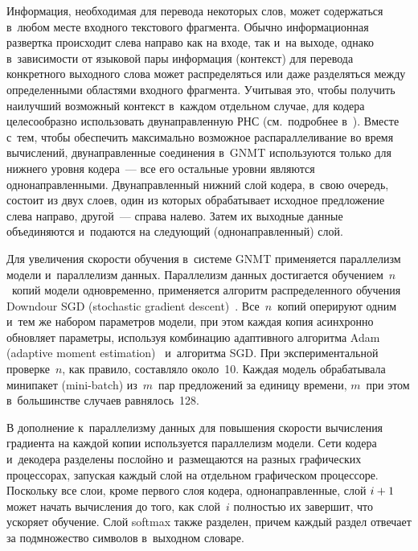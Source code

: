 \begin{multicols}{2}
  Информация, необходимая для перевода некоторых слов, может содержаться 
в~любом месте входного текстового фрагмента. Обычно информационная 
развертка происходит слева направо как на входе, так и~на выходе, однако 
в~зависимости от языковой пары информация (контекст) для перевода 
конкретного выходного слова может распределяться или даже разделяться 
между определенными областями входного фрагмента. Учитывая это, чтобы 
получить наилучший возможный контекст в~каждом отдельном случае, для 
кодера целесообразно использовать двунаправленную РНС (см.\ подробнее 
в~\cite{1-nur, 22-nur}). Вместе с~тем, чтобы обеспечить максимально возможное 
распараллеливание во время вычислений, двунаправленные соединения 
в~GNMT используются только для нижнего уровня кодера~--- все его 
остальные уровни являются однонаправленными. Двунаправленный нижний 
слой кодера, в~свою очередь, состоит из двух слоев, один из которых 
обрабатывает исходное предложение слева направо, другой~--- справа налево. 
Затем их выходные данные объединяются и~подаются на следующий 
(однонаправленный) слой.
  
  Для увеличения скорости обучения в~системе GNMT применяется 
параллелизм модели и~параллелизм данных. Параллелизм данных достигается 
обучением~$n$~копий модели одновременно, применяется алгоритм 
распределенного обучения Downdour SGD (stochastic gradient  
descent)~\cite{23-nur}. Все~$n$~копий оперируют одним и~тем же набором 
параметров модели, при этом каждая копия асинхронно обновляет параметры, 
используя комбинацию адаптивного алгоритма Adam (adaptive moment 
estimation)~\cite{24-nur} и~алгоритма SGD. При экспериментальной 
проверке~$n$, как правило, составляло около~10. Каждая модель обрабатывала 
минипакет (mini-batch) из~$m$~пар предложений за единицу времени, 
$m$~при этом в~большинстве случаев равнялось~128.
  
  В дополнение к~параллелизму данных для повышения скорости вычисления 
градиента на каж\-дой копии используется параллелизм модели. Сети кодера 
и~декодера разделены послойно и~размещаются на разных графических 
процессорах, запуская каж\-дый слой на отдельном графическом процессоре. 
Поскольку все слои, кроме первого слоя кодера, однонаправленные, слой 
$i\hm+ 1$ может начать вычисления до того, как слой~$i$ полностью их 
завершит, что ускоряет обучение. Слой softmax также разделен, причем каждый 
раздел отвечает за подмножество символов в~выходном словаре.
  

\end{multicols}
